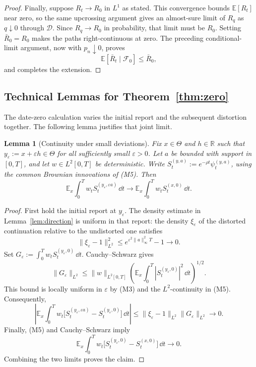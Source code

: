 \documentclass[12pt]{article}
\newtheorem{lemma}{Lemma}
\newcommand{\E}{\mathbb{E}}
\begin{document}
\begin{proof}
Finally, suppose \(R_t\to R_0\) in \(L^1\) as stated. This convergence
bounds \(\E[R_t]\) near zero, so the same upcrossing argument gives an
almost-sure limit of \(R_q\) as \(q\downarrow0\) through
\(\mathcal D\). Since \(R_q\to R_0\) in probability, that limit must be
\(R_0\). Setting \(\bar R_0=R_0\) makes the paths right-continuous at
zero. The preceding conditional-limit argument, now with
\(p_n\downarrow0\), proves
\[
  \E[\bar R_t\mid\mathcal F_0]\le\bar R_0,
\]
and completes the extension.
\end{proof}

\subsection{Technical Lemmas for Theorem~\ref{thm:zero}}
\label{app:lemmas-zero}

The date-zero calculation varies the initial report and the subsequent
distortion together. The following lemma justifies that joint limit.

\begin{lemma}[Continuity under small deviations]\label{lem:joint-direction}
Fix \(x\in\Theta\) and \(h\in\mathbb R\) such that
\(y_\varepsilon:=x+\varepsilon h\in\Theta\) for all sufficiently
small \(\varepsilon>0\). Let \(a\) be bounded with support in
\([0,T]\), and let \(w\in L^2[0,T]\) be deterministic. Write
\(S_t^{(y,a)}:=e^{-\rho t}\psi_t^{(y,a)}\), using the common
Brownian innovations of (M5). Then
\[
  \E_x\int_0^T w_tS_t^{(y_\varepsilon,\varepsilon a)}\,\dd t
  \longrightarrow
  \E_x\int_0^T w_tS_t^{(x,0)}\,\dd t.
\]
\end{lemma}

\begin{proof}
First hold the initial report at \(y_\varepsilon\). The density
estimate in Lemma~\ref{lem:direction} is uniform in that report:
the density \(\xi_\varepsilon\) of the distorted continuation
relative to the undistorted one satisfies
\[
  \|\xi_\varepsilon-1\|_{L^2}^2
  \leq e^{\varepsilon^2\|a\|_\infty^2T}-1\longrightarrow0.
\]
Set \(G_\varepsilon:=\int_0^T
w_tS_t^{(y_\varepsilon,0)}\,\dd t\). Cauchy--Schwarz gives
\[
  \|G_\varepsilon\|_{L^2}
  \leq\|w\|_{L^2[0,T]}
       \left(\E_x\int_0^T
          |S_t^{(y_\varepsilon,0)}|^2\,\dd t\right)^{1/2}.
\]
This bound is locally uniform in \(\varepsilon\) by (M3) and the
\(L^2\)-continuity in (M5). Consequently,
\[
  \left|
    \E_x\int_0^T w_t
      \bigl[S_t^{(y_\varepsilon,\varepsilon a)}
            -S_t^{(y_\varepsilon,0)}\bigr]\,\dd t
  \right|
  \leq\|\xi_\varepsilon-1\|_{L^2}\|G_\varepsilon\|_{L^2}
  \longrightarrow0.
\]
Finally, (M5) and Cauchy--Schwarz imply
\[
  \E_x\int_0^T w_t
    \bigl[S_t^{(y_\varepsilon,0)}-S_t^{(x,0)}\bigr]\,\dd t
  \longrightarrow0.
\]
Combining the two limits proves the claim.
\end{proof}
\end{document}
